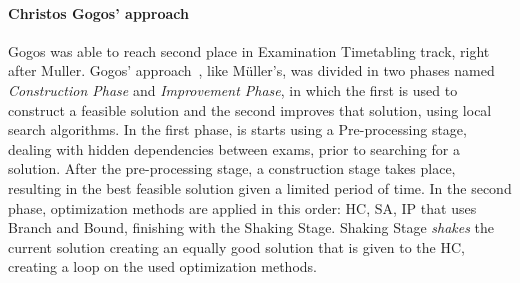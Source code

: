 
\paragraph{Christos Gogos' approach}

Gogos was able to reach second place in Examination Timetabling track, right after Muller. Gogos' approach~\cite{Gogos2012}, like M\"{u}ller's, was divided in two phases named \textit{Construction Phase} and \textit{Improvement Phase}, in which the first is used to construct a feasible solution and the second improves that solution, using local search algorithms. In the first phase, is starts using a Pre-processing stage, dealing with hidden dependencies between exams, prior to searching for a solution. 
After the pre-processing stage, a construction stage takes place, resulting in the best feasible solution given a limited period of time. 
In the second phase, optimization methods are applied in this order: HC, SA, IP that uses Branch and Bound, finishing with the Shaking Stage. Shaking Stage \textit{shakes} the current solution creating an equally good solution that is given to the HC, creating a loop on the used optimization methods.\\

